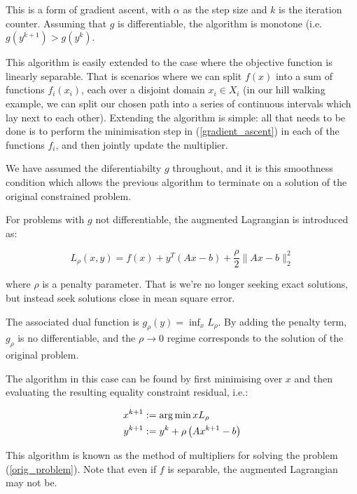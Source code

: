 This is a form of gradient ascent, with \( \alpha \) as the step size and \(k\) is the iteration counter. Assuming that \(g\) is differentiable, the algorithm is monotone (i.e. \( g\left(y^{k+1}\right) > g\left(y^{k}\right)\).

This algorithm is easily extended to the case where the objective function is linearly separable. That is scenarios where we can split \(f\left(x\right)\) into a sum of functions \(f_i\left(x_i\right)\), each over a disjoint domain \(x_i \in X_i\) (in our hill walking example, we can split our chosen path into a series of continuous intervals which lay next to each other). Extending the algorithm is simple: all that needs to be done is to perform the minimisation step in (\ref{gradient_ascent}) in each of the functions \(f_i\), and then jointly update the multiplier.

We have assumed the diferentiabilty \(g\) throughout, and it is this smoothness condition which allows the previous algorithm to terminate on a solution of the original constrained problem.

For problems with \(g\) not differentiable, the augmented Lagrangian is introduced as:

\begin{equation}
L_\rho\left(x,y\right) = f\left( x \right) + y^T\left(Ax-b\right) + \frac{\rho}{2}\|Ax-b\|_2^2
\end{equation}

where \(\rho\) is a penalty parameter. That is we're no longer seeking exact solutions, but instead seek solutions close in mean square error. 

The associated dual function is \(g_\rho\left(y\right) = \inf_x L_\rho\). By adding the penalty term, \(g_\rho\) is no differentiable, and the \(\rho \rightarrow 0\) regime corresponds to the solution of the original problem. 

The algorithm in this case can be found by first minimising over \(x\) and then evaluating the resulting equality constraint residual, i.e.:

\begin{align}
x^{k+1} &:= \operatorname*{arg\,min}{x} L_\rho \\
y^{k+1} &:= y^{k} + \rho \left(Ax^{k+1} - b\right)
\label{mom}
\end{align}

This algorithm is known as the method of multipliers for solving the problem (\ref{orig_problem}). Note that even if \(f\) is separable, the augmented Lagrangian may not be.

